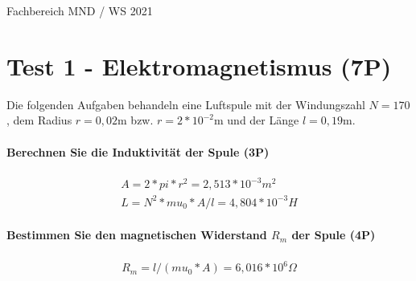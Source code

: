 \documentclass{article}
\begin{document}
Fachbereich MND / WS 2021


\part*{Test 1 - Elektromagnetismus (7P)}

Die folgenden Aufgaben behandeln eine Luftspule mit der Windungszahl $N=170$, dem Radius $r=0{,}02$m bzw. $r=2*10^{ -2 }$m und der Länge $l=0{,}19$m.

\subsection*{Berechnen Sie die Induktivität der Spule (3P)}


\begin{gather}
A=2 * pi * r ^ 2=2{,}513*10^{-3}m^2 \\
L=N ^ 2 * mu_0 * A / l=4{,}804*10^{-3}H
\end{gather}

\subsection*{Bestimmen Sie den magnetischen Widerstand $R_{m}$ der Spule (4P)}


\begin{gather}
R_{m}=l / (mu_0 * A)=6{,}016*10^{6}\Omega
\end{gather}
\end{document}
